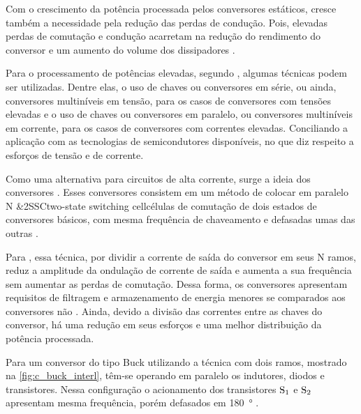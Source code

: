             Com o crescimento da potência processada pelos conversores estáticos, cresce também a necessidade pela redução das perdas de condução. Pois, elevadas perdas de comutação e condução acarretam na redução do rendimento do conversor e um aumento do volume dos dissipadores \cite{ref:BI_phd_Peraca}.
            
            Para o processamento de potências elevadas, segundo , algumas técnicas podem ser utilizadas. Dentre elas, o uso de chaves ou conversores em série, ou ainda, conversores multiníveis em tensão, para os casos de conversores com tensões elevadas e o uso de chaves ou conversores em paralelo, ou conversores multiníveis em corrente, para os casos de conversores com correntes elevadas. Conciliando a aplicação com as tecnologias de semicondutores disponíveis, no que diz respeito a esforços de tensão e de corrente.
            
            Como uma alternativa para circuitos de alta corrente, surge a ideia dos conversores \interleaved. Esses conversores consistem em um método de colocar em paralelo N \abreviatura&{2SSC}{two-state switching cell}{células de comutação de dois estados} de conversores básicos, com mesma frequência de chaveamento e defasadas umas das outras \cite{ref:BI_artigo_DesignSimul}. 
            
            Para , essa técnica, por dividir a corrente de saída do conversor em seus N ramos, reduz a amplitude da ondulação de corrente de saída e aumenta a sua frequência sem aumentar as perdas de comutação. Dessa forma, os conversores \interleaved apresentam requisitos de filtragem e armazenamento de energia menores se comparados aos conversores não \interleaved. Ainda, devido a divisão das correntes entre as chaves do conversor, há uma redução em seus esforços e uma melhor distribuição da potência processada. 
            
            Para um conversor do tipo Buck utilizando a técnica \interleaving com dois ramos, mostrado na \autoref{fig:c_buck_interl}, têm-se operando em paralelo os indutores, diodos e transistores. Nessa configuração o acionamento dos transistores $\text{S}_\text{1}$ e $\text{S}_\text{2}$ apresentam mesma frequência, porém defasados em \SI{180}{\degree} \cite{ref:BI_artigo_DesignSimul}.
            
